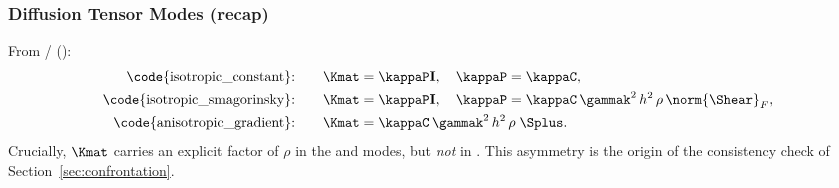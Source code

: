\subsubsection{Diffusion Tensor Modes (recap)}
\label{sec:diffusion-tensor-recap}
From /
():
\begin{align}
  \text{\code{isotropic\_constant}:} \qquad & \Kmat=\kappaP\mathbf I, \quad \kappaP=\kappaC, \\
  \text{\code{isotropic\_smagorinsky}:} \qquad & \Kmat=\kappaP\mathbf I, \quad \kappaP=\kappaC\,\gammak^2\,h^2\,\rho\,\norm{\Shear}_F, \\
  \text{\code{anisotropic\_gradient}:} \qquad & \Kmat = \kappaC\,\gammak^2\,h^2\,\rho \; \Splus .
\end{align}
Crucially, $\Kmat$ carries an explicit factor of $\rho$ in the
 and  modes, but
\emph{not} in . This asymmetry is the origin of
the consistency check of Section~\ref{sec:confrontation}.

